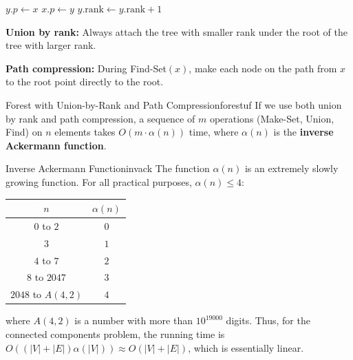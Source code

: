 \begin{algorithm}[H]
\caption{Union by Rank}
\begin{algorithmic}[1]
\State {}
\EndProcedure

\Statex %

        \State $y.p \gets x$
    \Else
        \State $x.p \gets y$
            \State $y.\text{rank} \gets y.\text{rank} + 1$
        \EndIf
    \EndIf
\EndProcedure
\end{algorithmic}
\end{algorithm}

\textbf{Union by rank:} Always attach the tree with smaller rank under the root of the tree 
with larger rank.

\textbf{Path compression:} During Find-Set$(x)$, make each node on the path from $x$ to the 
root point directly to the root.

\begin{complexity}{Forest with Union-by-Rank and Path Compression}{forestuf}
If we use both union by rank and path compression, a sequence of $m$ operations (Make-Set, 
Union, Find) on $n$ elements takes $O(m \cdot \alpha(n))$ time, where $\alpha(n)$ is the 
\textbf{inverse Ackermann function}.
\end{complexity}

\begin{remark}{Inverse Ackermann Function}{invack}
The function $\alpha(n)$ is an extremely slowly growing function. For all practical purposes, 
$\alpha(n) \le 4$:
\begin{center}
\begin{tabular}{cc}
\toprule
$n$ & $\alpha(n)$ \\
\midrule
$0$ to $2$ & $0$ \\
$3$ & $1$ \\
$4$ to $7$ & $2$ \\
$8$ to $2047$ & $3$ \\
$2048$ to $A(4,2)$ & $4$ \\
\bottomrule
\end{tabular}
\end{center}
where $A(4,2)$ is a number with more than $10^{19000}$ digits. Thus, for the connected 
components problem, the running time is $O((|V| + |E|) \alpha(|V|)) \approx O(|V| + |E|)$, 
which is essentially linear.
\end{remark}

